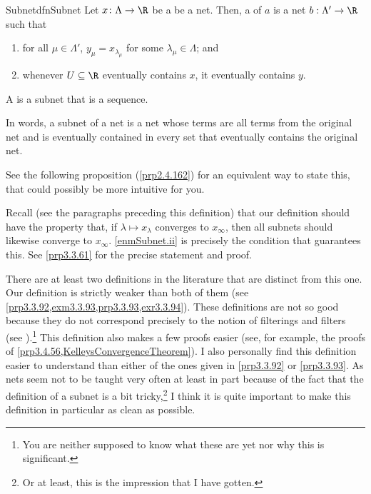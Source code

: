 \begin{dfn}{Subnet}{dfnSubnet}
Let $x\colon \Lambda \rightarrow \R$ be a be a net.  Then, a  of $a$ is a net $b:\Lambda '\rightarrow \R$ such that
\begin{enumerate}
\item \label{enmSubnet.i}for all $\mu \in \Lambda '$, $y_\mu =x_{\lambda _\mu}$ for some $\lambda _\mu \in \Lambda$; and
\item \label{enmSubnet.ii}whenever $U\subseteq \R$ eventually contains $x$, it eventually contains $y$.
\end{enumerate}
A  is a subnet that is a sequence.
\begin{rmk}
In words, a subnet of a net is a net whose terms are all terms from the original net and is eventually contained in every set that eventually contains the original net.
\end{rmk}
\begin{rmk}
See the following proposition (\cref{prp2.4.162}) for an equivalent way to state this, that could possibly be more intuitive for you.
\end{rmk}
\begin{rmk}
Recall (see the paragraphs preceding this definition) that our definition should have the property that, if $\lambda \mapsto x_{\lambda}$ converges to $x_{\infty}$, then all subnets should likewise converge to $x_{\infty}$.  \cref{enmSubnet.ii} is precisely the condition that guarantees this.  See \cref{prp3.3.61} for the precise statement and proof.
\end{rmk}
\begin{rmk}
There are at least two definitions in the literature that are distinct from this one.  Our definition is strictly weaker than both of them (see \cref{prp3.3.92,exm3.3.93,prp3.3.93,exr3.3.94}).  These definitions are not so good because they do not correspond precisely to the notion of filterings and filters (see ).\footnote{You are neither supposed to know what these are yet nor why this is significant.}  This definition also makes a few proofs easier (see, for example, the proofs of \cref{prp3.4.56,KelleysConvergenceTheorem}).  I also personally find this definition easier to understand than either of the ones given in \cref{prp3.3.92} or \cref{prp3.3.93}.  As nets seem not to be taught very often at least in part because of the fact that the definition of a subnet is a bit tricky,\footnote{Or at least, this is the impression that I have gotten.} I think it is quite important to make this definition in particular as clean as possible.

\end{rmk}
\end{dfn}
